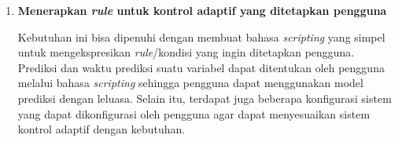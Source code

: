 \begin{enumerate}
    \item \textbf{Menerapkan \textit{rule} untuk kontrol adaptif yang ditetapkan pengguna}
    
    Kebutuhan ini bisa dipenuhi dengan membuat bahasa \textit{scripting} yang simpel untuk mengekspresikan \textit{rule}/kondisi yang ingin ditetapkan pengguna. Prediksi dan waktu prediksi suatu variabel dapat ditentukan oleh pengguna melalui bahasa \textit{scripting} sehingga pengguna dapat menggunakan model prediksi dengan leluasa. Selain itu, terdapat juga beberapa konfigurasi sistem yang dapat dikonfigurasi oleh pengguna agar dapat menyesuaikan sistem kontrol adaptif dengan kebutuhan.

\end{enumerate}
